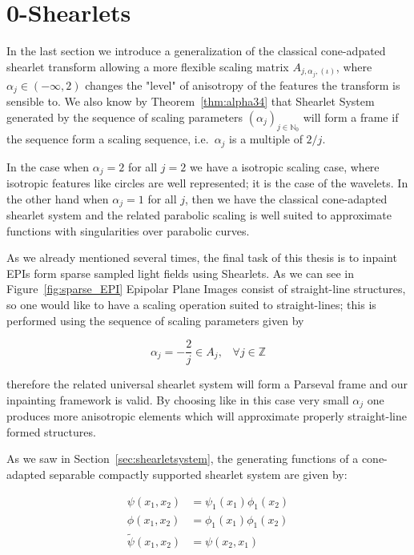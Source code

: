 \section{0-Shearlets}
\label{sec:0-Shearlets}

In the last section we introduce a generalization of the classical cone-adpated shearlet transform allowing a more flexible scaling matrix $A_{j,\alpha_j,(\iota)}$, where $\alpha_j\in (-\infty,2)$ changes the "level" of anisotropy of the features the transform is sensible to. We also know by Theorem~\ref{thm:alpha34} that Shearlet System generated by the sequence of scaling parameters $(\alpha_j)_{j\in\mathbb{N}_0}$ will form a frame if the sequence form a scaling sequence, i.e.\ $\alpha_j$ is a multiple of $2/j$.

\bigskip

 In the case when $\alpha_j=2$ for all $j=2$ we have a isotropic scaling case, where isotropic features like circles are well represented; it is the case of the wavelets. In the other hand when $\alpha_j=1$ for all $j$, then we have the classical cone-adapted shearlet system and the related parabolic scaling is well suited to approximate functions with singularities over parabolic curves. 

\bigskip

As we already mentioned several times, the final task of this thesis is to inpaint EPIs form sparse sampled light fields using Shearlets. As we can see in Figure~\ref{fig:sparse_EPI} Epipolar Plane Images consist of straight-line structures, so one would like to have a scaling operation suited to straight-lines; this is performed using the sequence of scaling parameters given by

$$
\alpha_j=-\frac{2}{j}\in A_j\textrm{,}\quad \forall j\in\mathbb{Z}
$$

therefore the related universal shearlet system will form a Parseval frame and our inpainting framework is valid. By choosing like in this case very small $\alpha_j$ one produces more anisotropic elements which will approximate properly straight-line formed structures.

\bigskip

As we saw in Section~\ref{sec:shearletsystem}, the generating functions of a cone-adapted separable compactly supported shearlet system are given by:

$$
\begin{aligned}
\psi(x_1,x_2)&=\psi_1(x_1)\phi_1(x_2)\\
\phi(x_1,x_2)&=\phi_1(x_1)\phi_1(x_2)\\
\tilde{\psi}(x_1,x_2)&=\psi(x_2,x_1)
\end{aligned}
$$

